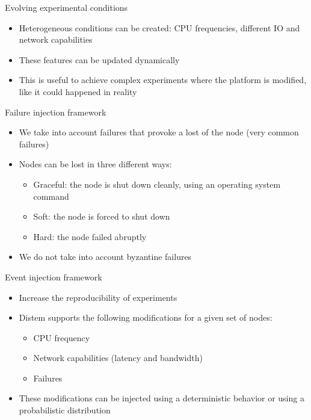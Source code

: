 \documentclass[11pt,xcolor=dvipsnames,presentation]{beamer}
\begin{document}
\begin{frame}[label=sec-1-0-4]{Evolving experimental conditions}
\begin{itemize}
\item Heterogeneous conditions can be created: CPU frequencies,
different IO and network capabilities

\item These features can be updated dynamically

\item This is useful to achieve complex experiments where the platform is modified,
like it could happened in reality
\end{itemize}
\end{frame}

\begin{frame}[label=sec-1-0-5]{Failure injection framework}

\begin{itemize}
\item We take into account failures that provoke a lost of the node (very common failures)

\item Nodes can be lost in three different ways:

\begin{itemize}
\item \alert{Graceful}: the node is shut down cleanly, using an operating system command
\item \alert{Soft}: the node is forced to shut down
\item \alert{Hard}: the node failed abruptly
\end{itemize}

\item We do not take into account byzantine failures
\end{itemize}
\end{frame}

\begin{frame}[label=sec-1-0-6]{Event injection framework}
\begin{itemize}
\item Increase the reproducibility of experiments
\item Distem supports the following modifications for a given set of nodes:
\begin{itemize}
\item CPU frequency
\item Network capabilities (latency and bandwidth)
\item Failures
\end{itemize}
\item These modifications can be injected using a deterministic behavior or using
a probabilistic distribution
\end{itemize}
\end{frame}
\end{document}
